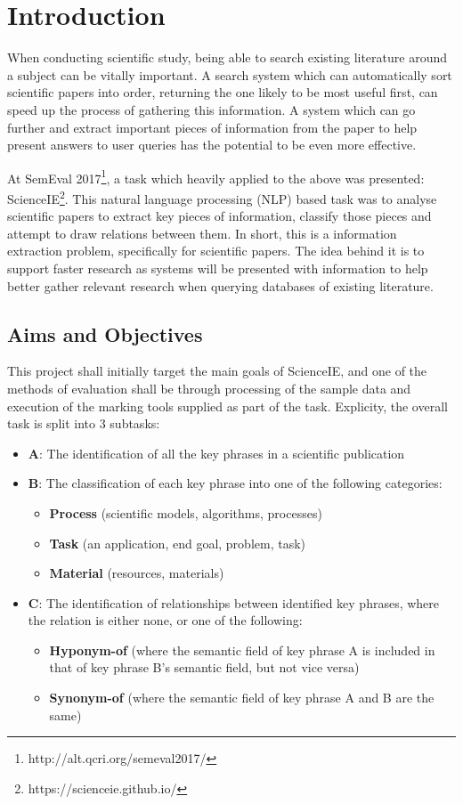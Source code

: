 \chapter{Introduction}

When conducting scientific study, being able to search existing literature around a subject can be vitally important. A search system which can automatically sort scientific papers into order, returning the one likely to be most useful first, can speed up the process of gathering this information. A system which can go further and extract important pieces of information from the paper to help present answers to user queries has the potential to be even more effective.

At SemEval 2017\footnote{http://alt.qcri.org/semeval2017/}, a task which heavily applied to the above was presented: ScienceIE\footnote{https://scienceie.github.io/}. This natural language processing (NLP) based task was to analyse scientific papers to extract key pieces of information, classify those pieces and attempt to draw relations between them. In short, this is a information extraction problem, specifically for scientific papers. The idea behind it is to support faster research as systems will be presented with information to help better gather relevant research when querying databases of existing literature.

\section{Aims and Objectives}

This project shall initially target the main goals of ScienceIE, and one of the methods of evaluation shall be through processing of the sample data and execution of the marking tools supplied as part of the task. Explicity, the overall task is split into 3 subtasks:

\begin{itemize}
	\item \textbf{A}: The identification of all the key phrases in a scientific publication
	\item \textbf{B}: The classification of each key phrase into one of the following categories:
	\begin{itemize}
		\item \textbf{Process} (scientific models, algorithms, processes)
		\item \textbf{Task} (an application, end goal, problem, task)
		\item \textbf{Material} (resources, materials)
	\end{itemize}
	\item \textbf{C}: The identification of relationships between identified key phrases, where the relation is either none, or one of the following:
	\begin{itemize}
		\item \textbf{Hyponym-of} (where the semantic field of key phrase A is included in that of key phrase B's semantic field, but not vice versa)
		\item \textbf{Synonym-of} (where the semantic field of key phrase A and B are the same)
	\end{itemize}
\end{itemize}

